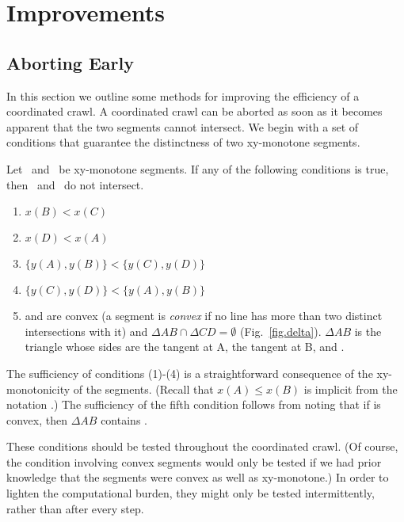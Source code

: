 \section{Improvements}
\label{sec.improve}

\subsection{Aborting Early}

In this section we outline some methods for improving the efficiency of a 
coordinated crawl.
A coordinated crawl can be aborted as soon as it becomes apparent that the two 
segments cannot intersect.
We begin with a set of conditions that guarantee the distinctness of two 
xy-monotone segments.

\begin{lemma}
\label{lem-badconds}
Let \ and \ be xy-monotone segments.
If any of the following conditions is true, then \ and \ do not
intersect.  
\begin{enumerate}
	\item $x(B) < x(C)$
	\item $x(D) < x(A)$
	\item $\{y(A),y(B)\} < \{y(C),y(D)\}$
	\item $\{y(C),y(D)\} < \{y(A),y(B)\}$
	\item {} and  are convex (a segment is {\em convex} if
			no line has more than two distinct intersections with it)
	    	and $\Delta AB \cap \Delta CD = \emptyset$ (Fig.~\ref{fig.delta}).
	$\Delta AB$ is the triangle whose sides are the tangent at 
	A, the tangent at B, and .
\end{enumerate}
\end{lemma}
%
The sufficiency of conditions (1)-(4) is a straightforward consequence of the 
xy-monotonicity of the segments.
(Recall that $x(A) \leq x(B)$ is implicit 
	from the notation .)
The sufficiency of the fifth condition follows from noting that
if  is convex, then $\Delta AB$ contains .
\QED


These conditions should be tested throughout the coordinated crawl.
(Of course, the condition involving convex segments would only be tested if we had
prior knowledge that the segments were convex as well as xy-monotone.)
In order to lighten the computational burden, they might only be tested intermittently, 
rather than after every step.

